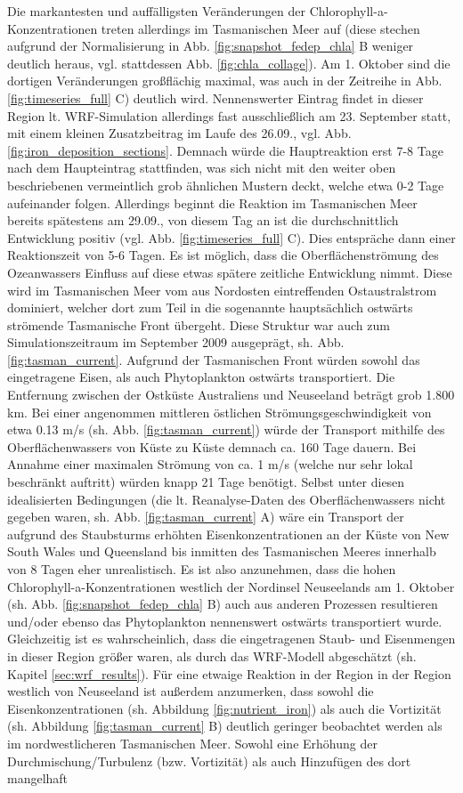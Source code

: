 \documentclass[12pt,a4paper,onecolumn,headheight=30pt]{scrartcl}
\begin{document}
Die markantesten und auffälligsten Veränderungen der Chlorophyll-a-Konzentrationen treten allerdings im Tasmanischen Meer auf (diese stechen aufgrund der Normalisierung in Abb. \ref{fig:snapshot_fedep_chla} B weniger deutlich heraus, vgl. stattdessen Abb. \ref{fig:chla_collage}). Am 1. Oktober sind die dortigen Veränderungen großflächig maximal, was auch in der Zeitreihe in Abb. \ref{fig:timeseries_full} C) deutlich wird. Nennenswerter Eintrag findet in dieser Region lt. WRF-Simulation allerdings fast ausschließlich am 23. September statt, mit einem kleinen Zusatzbeitrag im Laufe des 26.09., vgl. Abb. \ref{fig:iron_deposition_sections}. Demnach würde die Hauptreaktion erst 7-8 Tage nach dem Haupteintrag stattfinden, was sich nicht mit den weiter oben beschriebenen vermeintlich grob ähnlichen Mustern deckt, welche etwa 0-2 Tage aufeinander folgen. Allerdings beginnt die Reaktion im Tasmanischen Meer bereits spätestens am 29.09., von diesem Tag an ist die durchschnittlich Entwicklung positiv (vgl. Abb. \ref{fig:timeseries_full} C). Dies entspräche dann einer Reaktionszeit von 5-6 Tagen. Es ist möglich, dass die Oberflächenströmung des Ozeanwassers Einfluss auf diese etwas spätere zeitliche Entwicklung nimmt. Diese wird im Tasmanischen Meer vom aus Nordosten eintreffenden Ostaustralstrom dominiert, welcher dort zum Teil in die sogenannte hauptsächlich ostwärts strömende Tasmanische Front übergeht. Diese Struktur war auch zum Simulationszeitraum im September 2009 ausgeprägt, sh. Abb. \ref{fig:tasman_current}. Aufgrund der Tasmanischen Front würden sowohl das eingetragene Eisen, als auch Phytoplankton ostwärts transportiert. Die Entfernung zwischen der Ostküste Australiens und Neuseeland beträgt grob 1.800 km. Bei einer angenommen mittleren östlichen Strömungsgeschwindigkeit von etwa 0.13 m/s (sh. Abb. \ref{fig:tasman_current}) würde der Transport mithilfe des Oberflächenwassers von Küste zu Küste demnach ca. 160 Tage dauern. Bei Annahme einer maximalen Strömung von ca. 1 m/s (welche nur sehr lokal beschränkt auftritt) würden knapp 21 Tage benötigt. Selbst unter diesen idealisierten Bedingungen (die lt. Reanalyse-Daten des Oberflächenwassers nicht gegeben waren, sh. Abb. \ref{fig:tasman_current} A) wäre ein Transport der aufgrund des Staubsturms erhöhten Eisenkonzentrationen an der Küste von New South Wales und Queensland bis inmitten des Tasmanischen Meeres innerhalb von 8 Tagen eher unrealistisch. Es ist also anzunehmen, dass die hohen Chlorophyll-a-Konzentrationen westlich der Nordinsel Neuseelands am 1. Oktober (sh. Abb. \ref{fig:snapshot_fedep_chla} B) auch aus anderen Prozessen resultieren und/oder ebenso das Phytoplankton nennenswert ostwärts transportiert wurde. Gleichzeitig ist es wahrscheinlich, dass die eingetragenen Staub- und Eisenmengen in dieser Region größer waren, als durch das WRF-Modell abgeschätzt (sh. Kapitel \ref{sec:wrf_results}). Für eine etwaige Reaktion in der Region in der Region westlich von Neuseeland ist außerdem anzumerken, dass sowohl die Eisenkonzentrationen (sh. Abbildung \ref{fig:nutrient_iron}) als auch die Vortizität (sh. Abbildung \ref{fig:tasman_current} B) deutlich geringer beobachtet werden als im nordwestlicheren Tasmanischen Meer. Sowohl eine Erhöhung der Durchmischung/Turbulenz (bzw. Vortizität) als auch Hinzufügen des dort mangelhaft 
\end{document}
